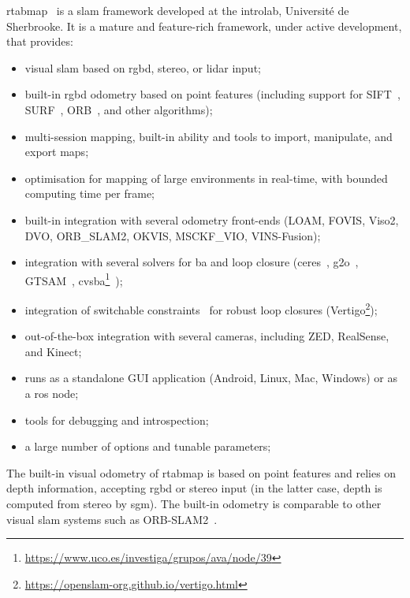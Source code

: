 \documentclass[11pt, letterpaper, twoside]{article}
\begin{document}
\gls{rtabmap}~\cite{labbe2019rtab} is a \gls{slam} framework developed at the
\gls{introlab}, Université de Sherbrooke. It is a mature and feature-rich
framework, under active development, that provides:
\begin{itemize}
    \item visual \gls{slam} based on \gls{rgbd}, stereo, or lidar input;
    \item built-in \gls{rgbd} odometry based on point features (including
        support for SIFT~\cite{lowe1999object}, SURF~\cite{bay2006surf},
        ORB~\cite{rublee2011orb}, and other algorithms);
    \item multi-session mapping, built-in ability and tools to import,
        manipulate, and export maps;
    \item optimisation for mapping of large environments in real-time, with
        bounded computing time per frame;
    \item built-in integration with several odometry front-ends (LOAM, FOVIS,
        Viso2, DVO, ORB\_SLAM2, OKVIS, MSCKF\_VIO, VINS-Fusion);
    \item integration with several solvers for \gls{ba} and loop closure
        (ceres~\cite{ceres-solver}, g2o~\cite{grisetti2011g2o},
        GTSAM~\cite{dellaert2006square},
        cvsba\footnote{\url{https://www.uco.es/investiga/grupos/ava/node/39}}~\cite{lourakis2009sba});
    \item integration of switchable constraints~\cite{sunderhauf2012switchable}
        for robust loop closures
        (Vertigo\footnote{\url{https://openslam-org.github.io/vertigo.html}});
    \item out-of-the-box integration with several cameras, including ZED,
        RealSense, and Kinect;
    \item runs as a standalone GUI application (Android, Linux, Mac, Windows)
        or as a \gls{ros} node;
    \item tools for debugging and introspection;
    \item a large number of options and tunable parameters;
\end{itemize}

The built-in visual odometry of \gls{rtabmap} is based on point features and
relies on depth information, accepting \gls{rgbd} or stereo input (in the
latter case, depth is computed from stereo by \gls{sgm}). The built-in odometry
is comparable to other visual \gls{slam} systems such as
ORB-SLAM2~\cite{ragot2019benchmark}.
\end{document}
